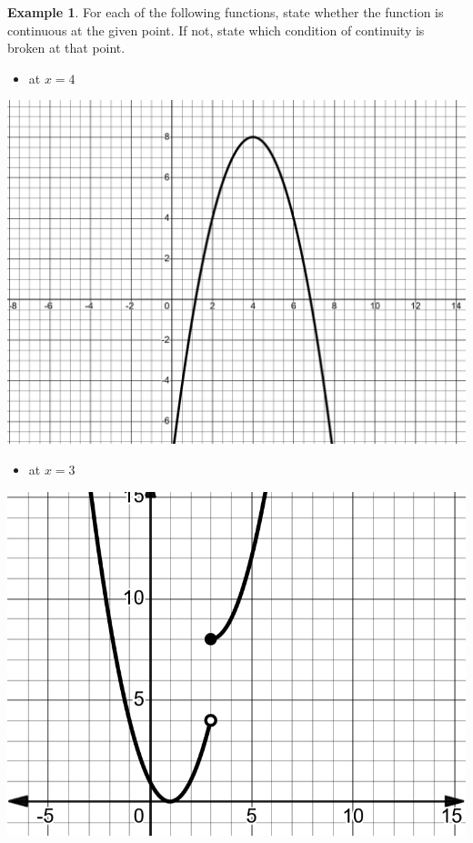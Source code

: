 \documentclass[
]{book}
\providecommand{\tightlist}{%
  \setlength{\itemsep}{0pt}\setlength{\parskip}{0pt}}
\theoremstyle{definition}
\theoremstyle{definition}
\newtheorem{example}{Example}[chapter]
\theoremstyle{definition}
\theoremstyle{definition}
\theoremstyle{remark}
\begin{document}
\begin{example}
\protect\hypertarget{exm:unnamed-chunk-19}{}\label{exm:unnamed-chunk-19}For each of the following functions, state whether the function is continuous at the given point. If not, state which condition of continuity is broken at that point.

\begin{itemize}
\tightlist
\item
  at \(x = 4\)
\end{itemize}

\includegraphics{fig/fig7.png}

\begin{itemize}
\tightlist
\item
  at \(x = 3\)
\end{itemize}

\includegraphics{fig/fig8.png}


\end{example}
\end{document}
